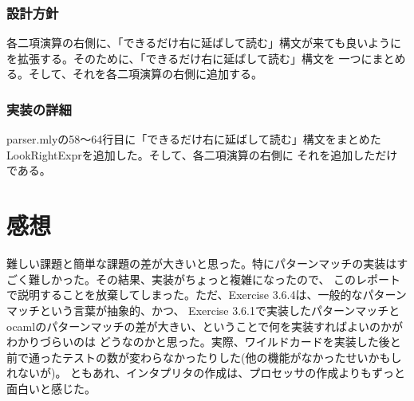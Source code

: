\documentclass{jarticle}
\begin{document}
\subsubsection{設計方針}
各二項演算の右側に、「できるだけ右に延ばして読む」構文が来ても良いようにを拡張する。そのために、「できるだけ右に延ばして読む」構文を
一つにまとめる。そして、それを各二項演算の右側に追加する。
\subsubsection{実装の詳細}
parser.mlyの58〜64行目に「できるだけ右に延ばして読む」構文をまとめたLookRightExprを追加した。そして、各二項演算の右側に
それを追加しただけである。

\section{感想}
難しい課題と簡単な課題の差が大きいと思った。特にパターンマッチの実装はすごく難しかった。その結果、実装がちょっと複雑になったので、
このレポートで説明することを放棄してしまった。ただ、Exercise 3.6.4は、一般的なパターンマッチという言葉が抽象的、かつ、
Exercise 3.6.1で実装したパターンマッチとocamlのパターンマッチの差が大きい、ということで何を実装すればよいのかがわかりづらいのは
どうなのかと思った。実際、ワイルドカードを実装した後と前で通ったテストの数が変わらなかったりした(他の機能がなかったせいかもしれないが)。
ともあれ、インタプリタの作成は、プロセッサの作成よりもずっと面白いと感じた。
\end{document}
